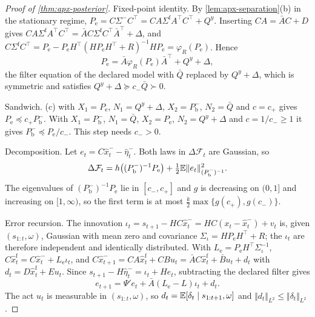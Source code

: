 \begin{proof}[Proof of \cref{thm:apx-posterior}]
Fixed-point identity. By \cref{lem:apx-separation}(b) in the stationary regime, $P_{\mathrm e}=C\Sigma^-C^\top=CA\Sigma^{\mathrm f}A^\top C^\top+Q^y$. Inserting $CA=\bar AC+D$ gives $CA\Sigma^{\mathrm f}A^\top C^\top=\bar AC\Sigma^{\mathrm f}C^\top\bar A^\top+\Delta$, and $C\Sigma^{\mathrm f}C^\top=P_{\mathrm e}-P_{\mathrm e}H^\top(HP_{\mathrm e}H^\top+R)^{-1}HP_{\mathrm e}=\varphi_R(P_{\mathrm e})$. Hence
\begin{equation}\label{eq:apx-fixed-point}
P_{\mathrm e}=\bar A\varphi_R(P_{\mathrm e})\bar A^\top+Q^y+\Delta ,
\end{equation}
the filter equation of the declared model with $\bar Q$ replaced by $Q^y+\Delta$, which is symmetric and satisfies $Q^y+\Delta\succeq c_-\bar Q\succ0$.

Sandwich. (c) with $X_1=P_{\mathrm e}$, $N_1=Q^y+\Delta$, $X_2=P^-_{\mathrm b}$, $N_2=\bar Q$ and $c=c_+$ gives $P_{\mathrm e}\preceq c_+P^-_{\mathrm b}$. With $X_1=P^-_{\mathrm b}$, $N_1=\bar Q$, $X_2=P_{\mathrm e}$, $N_2=Q^y+\Delta$ and $c=1/c_-\ge1$ it gives $P^-_{\mathrm b}\preceq P_{\mathrm e}/c_-$. This step needs $c_->0$.

Decomposition. Let $e_t=C\hat x^-_t-\hat\eta^-_t$. Both laws in $\Delta\mathcal F_t$ are Gaussian, so
\begin{equation}\label{eq:apx-excess-split}
\Delta\mathcal F_t=h\bigl((P^-_{\mathrm b})^{-1}P_{\mathrm e}\bigr)+\tfrac12\mathbb{E}\Vert e_t\Vert^2_{(P^-_{\mathrm b})^{-1}} .
\end{equation}
The eigenvalues of $(P^-_{\mathrm b})^{-1}P_{\mathrm e}$ lie in $[c_-,c_+]$ and $g$ is decreasing on $(0,1]$ and increasing on $[1,\infty)$, so the first term is at most $\frac k2\max\{g(c_+),g(c_-)\}$.

Error recursion. The innovation $\iota_t=s_{t+1}-HC\hat x^-_t=HC(x_t-\hat x^-_t)+v_t$ is, given $(s_{1:t},\omega)$, Gaussian with mean zero and covariance $\Sigma_\iota=HP_{\mathrm e}H^\top+R$; the $\iota_t$ are therefore independent and identically distributed. With $L_{\mathrm e}=P_{\mathrm e}H^\top\Sigma_\iota^{-1}$, $C\hat x^{\mathrm f}_t=C\hat x^-_t+L_{\mathrm e}\iota_t$, and $C\hat x^-_{t+1}=CA\hat x^{\mathrm f}_t+CBu_t=\bar AC\hat x^{\mathrm f}_t+\bar Bu_t+d_t$ with $d_t=D\hat x^{\mathrm f}_t+Eu_t$. Since $s_{t+1}-H\hat\eta^-_t=\iota_t+He_t$, subtracting the declared filter gives
\begin{equation}\label{eq:apx-error-recursion}
e_{t+1}=\Psi'e_t+\bar A(L_{\mathrm e}-L)\iota_t+d_t .
\end{equation}
The act $u_t$ is measurable in $(s_{1:t},\omega)$, so $d_t=\mathbb{E}[\delta_t\mid s_{1:t+1},\omega]$ and $\Vert d_t\Vert_{L^2}\le\Vert\delta_t\Vert_{L^2}$.


\end{proof}
